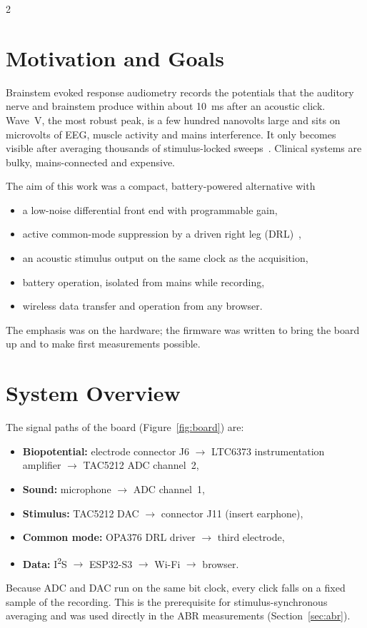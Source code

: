 \documentclass[
	a4paper,english
]{MFETechnicalReport}
\begin{document}
	\newpage
	\begin{multicols}{2}
		\tableofcontents

\section{Motivation and Goals}

Brainstem evoked response audiometry records the potentials that the auditory nerve and brainstem produce within about \SI{10}{\milli\second} after an acoustic click. Wave~V, the most robust peak, is a few hundred nanovolts large and sits on microvolts of EEG, muscle activity and mains interference. It only becomes visible after averaging thousands of stimulus-locked sweeps~\cite{Hall:2007abr,Picton:2011aep}. Clinical systems are bulky, mains-connected and expensive.

The aim of this work was a compact, battery-powered alternative with
\begin{itemize}
	\item a low-noise differential front end with programmable gain,
	\item active common-mode suppression by a driven right leg (DRL)~\cite{Winter:1983drl},
	\item an acoustic stimulus output on the same clock as the acquisition,
	\item battery operation, isolated from mains while recording,
	\item wireless data transfer and operation from any browser.
\end{itemize}
The emphasis was on the hardware; the firmware was written to bring the board up and to make first measurements possible.

\section{System Overview}

The signal paths of the board (Figure~\ref{fig:board}) are:
\begin{itemize}
	\item \textbf{Biopotential:} electrode connector J6 $\rightarrow$ LTC6373 instrumentation amplifier $\rightarrow$ TAC5212 ADC channel~2,
	\item \textbf{Sound:} microphone $\rightarrow$ ADC channel~1,
	\item \textbf{Stimulus:} TAC5212 DAC $\rightarrow$ connector J11 (insert earphone),
	\item \textbf{Common mode:} OPA376 DRL driver $\rightarrow$ third electrode,
	\item \textbf{Data:} I\textsuperscript{2}S $\rightarrow$ ESP32-S3 $\rightarrow$ Wi-Fi $\rightarrow$ browser.
\end{itemize}
Because ADC and DAC run on the same bit clock, every click falls on a fixed sample of the recording. This is the prerequisite for stimulus-synchronous averaging and was used directly in the ABR measurements (Section~\ref{sec:abr}).


\end{multicols}
\end{document}
